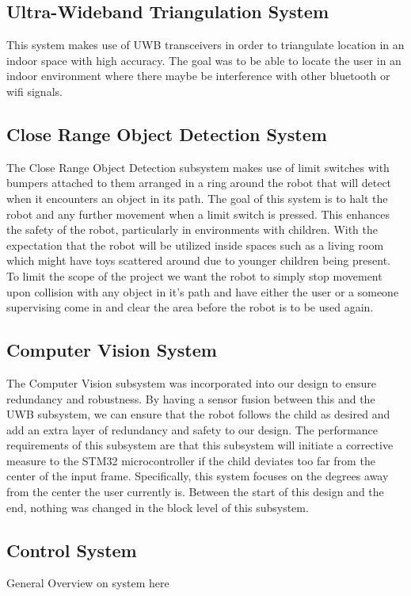 \documentclass{report}
\begin{document}
    \subsection{Ultra-Wideband Triangulation System}
    This system makes use of UWB transceivers in order to triangulate location in an indoor space with high accuracy. The goal was to be able to locate the user in an indoor environment where there maybe be interference with other bluetooth or wifi signals. 
    
    
    
    \subsection{Close Range Object Detection System}
    The Close Range Object Detection subsystem makes use of limit switches with bumpers attached to them arranged in a ring around the robot that will detect when it encounters an object in its path. The goal of this system is to halt the robot and any further movement when a limit switch is pressed. This enhances the safety of the robot, particularly in environments with children. With the expectation that the robot will be utilized inside spaces such as a living room which might have toys scattered around due to younger children being present. To limit the scope of the project we want the robot to simply stop movement upon collision with any object in it's path and have either the user or a someone supervising come in and clear the area before the robot is to be used again.
    
    \subsection{Computer Vision System}
    The Computer Vision subsystem was incorporated into our design to ensure redundancy and robustness. By having a sensor fusion between this and the UWB subsystem, we can ensure that the robot follows the child as desired and add an extra layer of redundancy and safety to our design. The performance requirements of this subsystem are that this subsystem will initiate a corrective measure to the STM32 microcontroller if the child deviates too far from the center of the input frame. Specifically, this system focuses on the degrees away from the center the user currently is. Between the start of this design and the end, nothing was changed in the block level of this subsystem.
    
    \subsection{Control System}
    General Overview on system here
    
\end{document}
